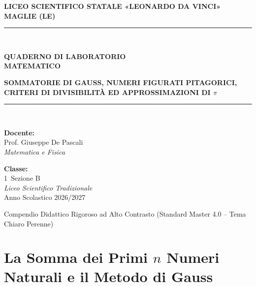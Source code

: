 \documentclass[11pt,a4paper,oneside]{report}
\begin{document}
\hypersetup{pageanchor=false}
\begin{titlepage}
\begin{center}
  \vspace*{0.8cm}
  {\Large\textbf{LICEO SCIENTIFICO STATALE «LEONARDO DA VINCI»}}\\[0.25cm]
  {\large\textbf{MAGLIE (LE)}}\\[1.8cm]
  \rule{\textwidth}{1.5pt}\\[0.6cm]
  {\fontsize{24}{32}\selectfont\bfseries\color{primaryBlue} QUADERNO DI LABORATORIO\\[0.25cm] MATEMATICO\par}\vspace{0.5cm}
  {\fontsize{13}{19}\selectfont\bfseries\color{textDark} SOMMATORIE DI GAUSS, NUMERI FIGURATI PITAGORICI,\\[0.15cm] CRITERI DI DIVISIBILIT\`A ED APPROSSIMAZIONI DI $\pi$\par}\vspace{0.5cm}
  \rule{\textwidth}{1.5pt}\\[2.0cm]
  
  \begin{minipage}{0.48\textwidth}
    \textbf{Docente:}\\
    Prof. Giuseppe De Pascali\\
    \textit{Matematica e Fisica}
  \end{minipage}
  \hfill
  \begin{minipage}{0.48\textwidth}
    \raggedleft
    \textbf{Classe:}\\
    1\textordfeminine\ Sezione B\\
    \textit{Liceo Scientifico Tradizionale}\\
    Anno Scolastico 2026/2027
  \end{minipage}

  \vfill
  {\small Compendio Didattico Rigoroso ad Alto Contrasto (Standard Master 4.0 -- Tema Chiaro Perenne)}
\end{center}
\end{titlepage}
\hypersetup{pageanchor=true}

\tableofcontents
\newpage
{}

\chapter{La Somma dei Primi \texorpdfstring{$n$}{n} Numeri Naturali e il Metodo di Gauss}
\end{document}
